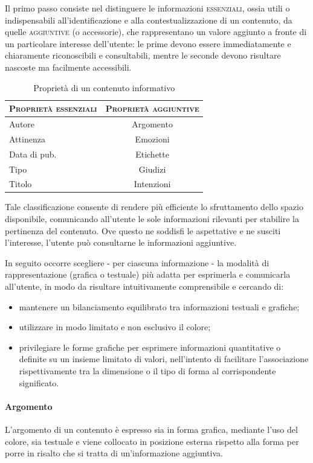 Il primo passo consiste nel distinguere le informazioni \textsc{essenziali}, ossia utili o indispensabili all'identificazione e alla contestualizzazione di un contenuto, da quelle \textsc{aggiuntive} (o accessorie), che rappresentano un valore aggiunto a fronte di un particolare interesse dell'utente: le prime devono essere immediatamente e chiaramente riconoscibili e consultabili, mentre le seconde devono risultare nascoste ma facilmente accessibili.

\begin{table}
	\centering
	\begin{tabular}{|l|c|}
	\hline
	\textsc{Proprietà essenziali} & \textsc{Proprietà aggiuntive} \\ \hline
	Autore  & Argomento \\
	Attinenza & Emozioni\\
	Data di pub. & Etichette \\
	Tipo & Giudizi \\
	Titolo & Intenzioni \\ \hline
	\end{tabular}
	\caption{Proprietà di un contenuto informativo}
	\label{tab:tesi:stage:design:tipi-proprietà}
\end{table}

Tale classificazione consente di rendere più efficiente lo sfruttamento dello spazio disponibile, comunicando all'utente le sole informazioni rilevanti per stabilire la pertinenza del contenuto. Ove questo ne soddisfi le aspettative e ne susciti l'interesse, l'utente può consultarne le informazioni aggiuntive.

In seguito occorre scegliere - per ciascuna informazione - la modalità di rappresentazione (grafica o testuale) più adatta per esprimerla e comunicarla all'utente, in modo da risultare intuitivamente comprensibile e cercando di:
\begin{itemize}
  \item mantenere un bilanciamento equilibrato tra informazioni testuali e grafiche;
  \item utilizzare in modo limitato e non esclusivo il colore;
  \item privilegiare le forme grafiche per esprimere informazioni quantitative o definite su un insieme limitato di valori, nell'intento di facilitare l'associazione rispettivamente tra la dimensione o il tipo di forma al corrispondente significato.
\end{itemize}

\paragraph{Argomento}
L'argomento di un contenuto è espresso sia in forma grafica, mediante l'uso del colore, sia testuale e viene collocato in posizione esterna rispetto alla forma per porre in risalto che si tratta di un'informazione aggiuntiva.
